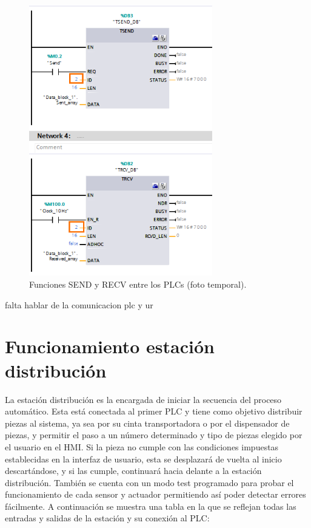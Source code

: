 \clearpage

\begin{figure} [h!]
  \begin{center}
    \includegraphics[width=8cm]{figs/comunicacion_plcs}
  \end{center}
  \caption{\centering Funciones SEND y RECV entre los PLCs (foto temporal).}
  \label{fig:comunicacion_plcs}
\end{figure} 

falta hablar de la comunicacion plc y ur

\section{Funcionamiento estación distribución}
\label{sec:funcionamiento_distribucion}

La estación distribución es la encargada de iniciar la secuencia del proceso automático. Esta está conectada al primer PLC y tiene como objetivo distribuir piezas al sistema, ya sea por su cinta transportadora o por el dispensador de piezas, y permitir el paso a un número determinado y tipo de piezas elegido por el usuario en el HMI. Si la pieza no cumple con las condiciones impuestas establecidas en la interfaz de usuario, esta se desplazará de vuelta al inicio descartándose, y si las cumple, continuará hacia delante a la estación distribución. También se cuenta con un modo test programado para probar el funcionamiento de cada sensor y actuador permitiendo así poder detectar errores fácilmente. A continuación se muestra una tabla en la que se reflejan todas las entradas y salidas de la estación y su conexión al PLC:

